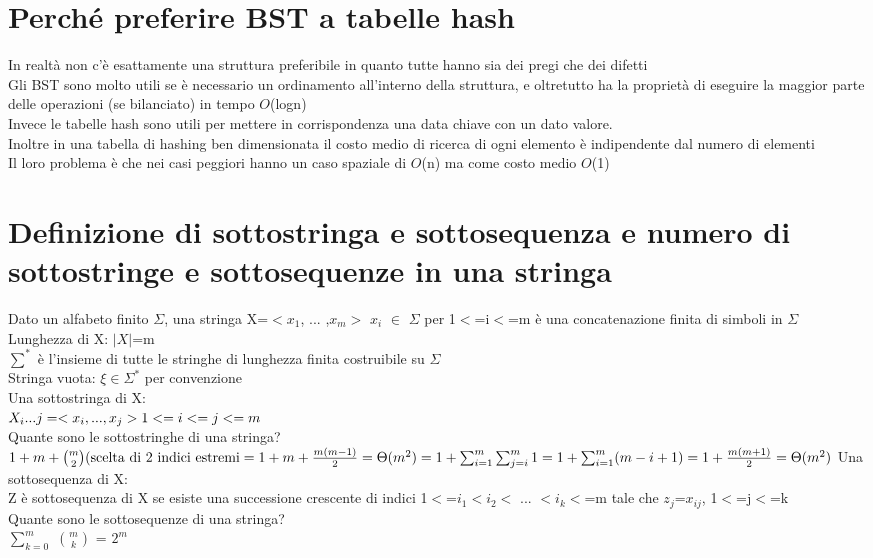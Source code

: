 \documentclass[12pt,oneside,a4paper]{article}
\newcommand\Omicron{O}
\begin{document}
\section{Perché preferire BST a tabelle hash}
In realtà non c'è esattamente una struttura preferibile in quanto tutte hanno sia dei pregi che dei difetti\\
Gli BST sono molto utili se è necessario un ordinamento all'interno della struttura, e oltretutto ha la proprietà di eseguire la maggior parte delle operazioni (se bilanciato) in tempo $\Omicron$(logn)\\
Invece le tabelle hash sono utili per mettere in corrispondenza una data chiave con un dato valore.\\
Inoltre in una tabella di hashing ben dimensionata il costo medio di ricerca di ogni elemento è indipendente dal numero di elementi\\
Il loro problema è che nei casi peggiori hanno un caso spaziale di $\Omicron$(n) ma come costo medio $\Omicron$(1)
\section{Definizione di sottostringa e sottosequenza  e numero di sottostringe e sottosequenze in una stringa}
Dato un alfabeto finito $\Sigma$, una stringa X=$<$$x_1$, ... ,$x_m$$>$ $x_i$ $\in$ $\Sigma$ per 1$<$=i$<$=m è una concatenazione finita di simboli in $\Sigma$\\
Lunghezza di X: $|X|$=m\\
$\sum^{\ast}$ è l'insieme di tutte le stringhe di lunghezza finita costruibile su $\Sigma$\\
Stringa vuota: $\xi$$\in$$\Sigma^{\ast}$ per convenzione\\
Una sottostringa di X:\\
\begin{math}
X_i ... j = <x_i, ... , x_j>\\
1<=i<=j<=m
\end{math}\\
Quante sono le sottostringhe di una stringa?\\
\begin{math}
1+m+\binom{m}{2} \text{(scelta di 2 indici estremi} = 1+m+\frac{m(m-1)}{2}=\Theta(m^2)\\
=1+\sum_{i=1}^{m}\sum_{j=i}^{m} 1=1+\sum_{i=1}^{m}(m-i+1)=1+\frac{m(m+1)}{2}=\Theta(m^2)
\end{math}
Una sottosequenza di X:\\
Z è sottosequenza di X se esiste una successione crescente di indici 1$<$=$i_{1}$$<$$i_{2}$$<$ ... $<$$i_{k}$$<$=m tale che $z_{j}$=$x_{ij}$, 1$<$=j$<$=k\\
Quante sono le sottosequenze di una stringa?\\
$\sum_{k=0}^{m}$ $\binom{m}{k}$ = $2^{m}$
\end{document}
